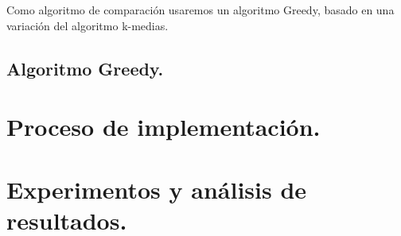 \documentclass[12pt, spanish]{article}
\begin{document}
Como algoritmo de comparación usaremos un algoritmo Greedy, basado en una variación del algoritmo k-medias.

\subsection{Algoritmo Greedy.}



\section{Proceso de implementación.}


\section{Experimentos y análisis de resultados.}
\end{document}
